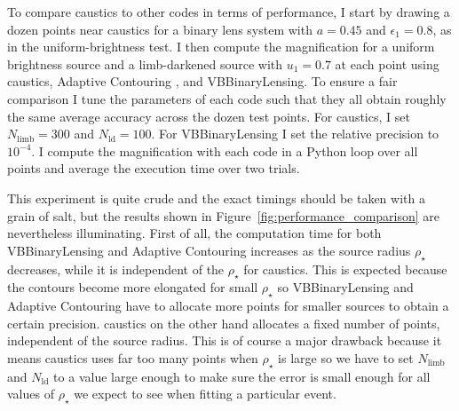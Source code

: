 \documentclass[12pt,dvipsnames]{report}
\newcommand{\ssf}[1]{\textsf{#1}}
\begin{document}
To compare \ssf{caustics} to other codes in terms of performance, I start by 
drawing a dozen points near caustics for a binary lens system with $a=0.45$ and $\epsilon_1=0.8$,
as in the uniform-brightness test. I then compute the magnification for 
a uniform brightness source and a limb-darkened source with $u_1=0.7$ at each point using 
\ssf{caustics}, \ssf{Adaptive Contouring} \citep{2007MNRAS.377.1679D}, and 
\ssf{VBBinaryLensing}. To ensure a fair comparison I tune the parameters of each code 
such that they all obtain roughly the same average accuracy across the dozen test points. For  
\ssf{caustics}, I set $N_\mathrm{limb}=300$ and $N_\mathrm{ld}=100$.
For \ssf{VBBinaryLensing} I set the relative precision to $10^{-4}$.
I compute the magnification with each code in a \ssf{Python} loop over all points and average 
the execution time over two trials. 

This experiment is quite crude and the exact timings should be taken with a grain of salt,
but the results shown in Figure~\ref{fig:performance_comparison} are nevertheless 
illuminating. First of all, the computation time for both \ssf{VBBinaryLensing} and 
\ssf{Adaptive Contouring} increases  as the source radius $\rho_\star$ decreases, while 
it is independent of the $\rho_\star$ for \ssf{caustics}. This is expected because the 
contours become more elongated for small $\rho_\star$ so \ssf{VBBinaryLensing} and
\ssf{Adaptive Contouring} have to allocate more points for smaller sources 
to obtain a certain precision. \ssf{caustics} on the other hand allocates a fixed number of points,
independent of the source radius. This is of course a major 
drawback because it means \ssf{caustics} uses far too many points when $\rho_\star$ is large so 
we have to set $N_\mathrm{limb}$ and $N_\mathrm{ld}$ to a value large enough to make sure 
the error is small enough for all values of $\rho_\star$ we expect to see when fitting 
a particular event.
\end{document}
